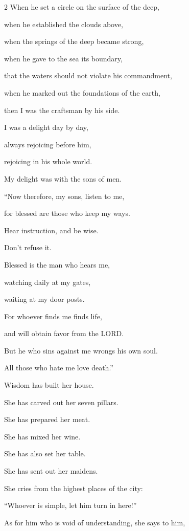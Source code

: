 \begin{multicols}{2}
When he set a circle on the surface of the deep,


\myverse{}when he established the clouds above,

when the springs of the deep became strong,


\myverse{}when he gave to the sea its boundary,

that the waters should not violate his commandment,

when he marked out the foundations of the earth,


\myverse{}then I was the craftsman by his side.

I was a delight day by day,

always rejoicing before him,


\myverse{}rejoicing in his whole world.

My delight was with the sons of men.


\vspace{\baselineskip} 
\myverse{}“Now therefore, my sons, listen to me,

for blessed are those who keep my ways.


\myverse{}Hear instruction, and be wise.

Don’t refuse it.


\myverse{}Blessed is the man who hears me,

watching daily at my gates,

waiting at my door posts.


\myverse{}For whoever finds me finds life,

and will obtain favor from the LORD.


\myverse{}But he who sins against me wrongs his own soul.

All those who hate me love death.”


\mychapter{} \myverse*{}Wisdom has built her house.

She has carved out her seven pillars.


\myverse{}She has prepared her meat.

She has mixed her wine.

She has also set her table.


\myverse{}She has sent out her maidens.

She cries from the highest places of the city:


\myverse{}“Whoever is simple, let him turn in here!”

As for him who is void of understanding, she says to him,



\end{multicols}
